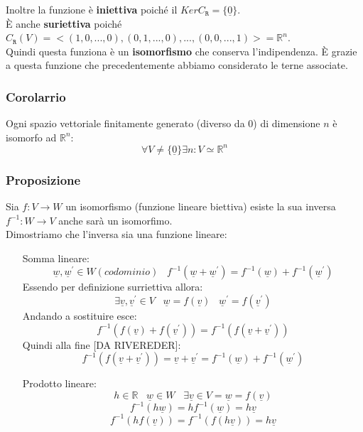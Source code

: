 Inoltre la funzione è \textbf{iniettiva} poiché il $Ker C_{\mathtt{R}}= \{\underline{0}\}$.\\
È anche \textbf{suriettiva} poiché $C_{\mathtt{R}}(V) = <(1,0,...,0),(0,1,...,0),...,(0,0,...,1)> = \mathbb{R}^n$.\\
Quindi questa funziona è un \textbf{isomorfismo} che conserva l'indipendenza.
È grazie a questa funzione che precedentemente abbiamo considerato le terne associate.

\subsubsection{Corolarrio}
Ogni spazio vettoriale finitamente generato (diverso da 0) di dimensione $n$ è isomorfo ad $\mathbb{R}^n$:
$$ \forall V \neq \{\underline{0}\} \exists n: V \simeq \mathbb{R}^n $$

\subsubsection{Proposizione}
Sia $f: V \rightarrow W$ un isomorfismo (funzione lineare biettiva) esiste la sua inversa $f^{-1}: W \rightarrow V$ anche sarà un isomorfimo.\\
Dimostriamo che l'inversa sia una funzione lineare:
\begin{itemize}
\item[Somma lineare:]
$$\underline{w},\underline{w}^{\prime} \in W(codominio) \;\;\; f^{-1}(\underline{w}+\underline{w}^{\prime}) = f^{-1}(\underline{w})+f^{-1}(\underline{w}^{\prime})$$
Essendo per definizione surriettiva allora:
$$ \exists \underline{v},\underline{v}^{\prime} \in V \;\;\;  \underline{w}=f(\underline{v}) \;\;\; \underline{w}^{\prime}=f(\underline{v}^{\prime}) $$
Andando a sostituire esce:
$$ f^{-1}(f(\underline{v})+f(\underline{v}^{\prime})) = f^{-1}(f(\underline{v}+\underline{v}^{\prime}))$$
Quindi alla fine [DA RIVEREDER]:
$$ f^{-1}(f(\underline{v}+\underline{v}^{\prime})) = \underline{v}+\underline{v}^{\prime} = f^{-1}(\underline{w})+f^{-1}(\underline{w}^{\prime})$$

\item[Prodotto lineare:]
$$ h \in \mathbb{R} \;\;\; \underline{w} \in W \;\;\; \exists \underline{v} \in V = \underline{w} = f (\underline{v}) $$
$$ f^{-1}(h \underline{w}) = h f^{-1}(\underline{w}) = h \underline{v} $$
$$ f^{-1}(h f(\underline{v})) = f^{-1}(f(h\underline{v})) = h \underline{v}$$

\end{itemize}



